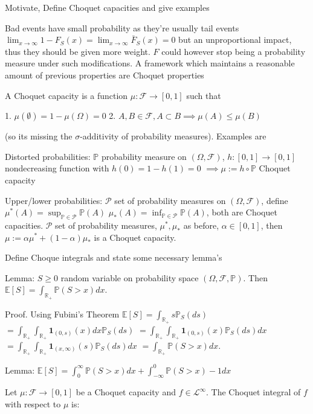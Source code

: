 \documentclass[11pt,a4paper,twoside]{article}
\begin{document}
Motivate, Define Choquet capacities and give examples

Bad events have small probability as they're usually tail events 
\( \lim_{x \to \infty} 1 - F_S(x) = \lim_{x \to \infty} \bar{F}_S(x) = 0\)
but an unproportional impact, thus they should be given more weight.
\( F \) could however stop being a probability measure under such modifications.
A framework which maintains a reasonable amount of previous properties
are Choquet properties

A Choquet capacity is a function \(\mu: \mathcal{F} \rightarrow [0, 1]\) such that

1. \(\mu(\emptyset) = 1 - \mu(\Omega) = 0\)
2. \(A, B \in \mathcal{F}, A \subset B \implies \mu(A) \le \mu(B)\)

(so its missing the \( \sigma \)-additivity of probability measures).
Examples are

Distorted probabilities: 
\(\mathbb{P}\) probability measure on \((\Omega, \mathcal{F})\), 
\(h: [0, 1] \rightarrow [0, 1]\) nondecreasing function with \(h(0) = 1 - h(1) = 0\)
\(\implies \mu := h \circ \mathbb{P}\) Choquet capacity

Upper/lower probabilities: 
\(\mathcal{P}\) set of probability measures on \((\Omega, \mathcal{F})\), define
\(\mu^*(A) = \sup_{\mathbb{P} \in \mathcal{P}} \mathbb{P}(A)\)
\(\mu_*(A) = \inf_{\mathbb{P} \in \mathcal{P}} \mathbb{P}(A)\),
both are Choquet capacities.
\(\mathcal{P}\) set of probability measures, \(\mu^*, \mu_*\) as before, 
\(\alpha \in [0, 1]\), then \(\mu := \alpha \mu^* + (1 - \alpha) \mu_*\) is a Choquet capacity.


Define Choque integrals and state some necessary lemma's

Lemma:
\(S \ge 0\) random variable on probability space \((\Omega, \mathcal{F}, \mathbb{P})\). Then
\(\mathbb{E}[S] = \int_{\mathbb{R}_{+}} \mathbb{P}(S > x) dx.\)

Proof.
Using Fubini's Theorem
\(\mathbb{E}[S] = \int_{\mathbb{R}_+} s \mathbb{P}_S(ds)\)
\(= \int_{\mathbb{R}_+} \int_{\mathbb{R}_+} \mathbf{1}_{(0, s)}(x) dx \mathbb{P}_S(ds)\)
\(= \int_{\mathbb{R}_+} \int_{\mathbb{R}_+} \mathbf{1}_{(0, s)}(x) \mathbb{P}_S(ds) dx \)
\(= \int_{\mathbb{R}_+} \int_{\mathbb{R}_+} \mathbf{1}_{(x, \infty)}(s) \mathbb{P}_S(ds) dx\)
\(= \int_{\mathbb{R}_+} \mathbb{P}(S > x) dx.\)

Lemma:
\( \mathbb{E}[S] = \int_{0}^\infty \mathbb{P}(S > x)dx + \int_{-\infty}^0 \mathbb{P}(S > x) - 1 dx \)

Let \( \mu : \mathcal{F} \to [0, 1] \) be a Choquet capacity and \( f \in \mathcal{L}^\infty \).
The Choquet integral of \( f \) with respect to \( \mu \) is:
\end{document}
